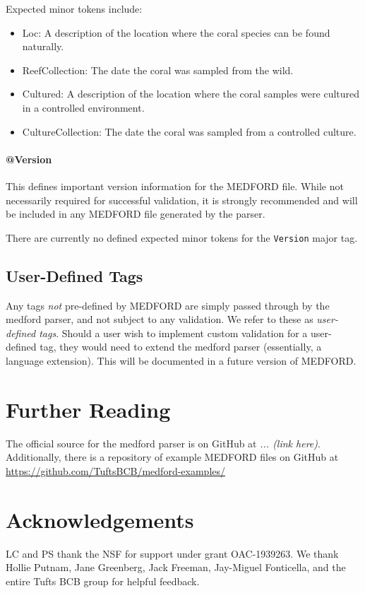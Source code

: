 \documentclass[10pt]{article}
\newcommand{\an}[1]{{\color{red} \em #1}}
\begin{document}
    Expected minor tokens include:
    \begin{itemize}
        \item Loc: A description of the location where the coral species can be found naturally.
        \item ReefCollection: The date the coral was sampled from the wild.
        \item Cultured: A description of the location where the coral samples were cultured in a controlled environment.
        \item CultureCollection: The date the coral was sampled from a controlled culture.
    \end{itemize}
    
    \paragraph{@Version}
    
    This defines important version information for the MEDFORD file. While not necessarily required for successful validation, it is strongly recommended and will be included in any MEDFORD file generated by the parser.
    
    There are currently no defined expected minor tokens for the \texttt{Version} major tag.
    


\subsection{User-Defined Tags}\label{user-defined}

Any tags \emph{not} pre-defined by MEDFORD are simply passed through by the medford parser, and not subject to any validation. We refer to these as \emph{user-defined tags}. Should a user wish to implement custom validation for a user-defined tag, they would need to extend the medford parser (essentially, a language extension). This will be documented in a future version of MEDFORD.

\section{Further Reading}{
    The official source for the medford parser is on GitHub at \an{... (link here)}.
    Additionally, there is a repository of example MEDFORD files on GitHub at \url{https://github.com/TuftsBCB/medford-examples/}
}

\section{Acknowledgements}{LC and PS thank the NSF for support under grant OAC-1939263. We thank Hollie Putnam, Jane Greenberg, Jack Freeman, Jay-Miguel Fonticella, and the entire Tufts BCB group for helpful feedback.}
\end{document}
